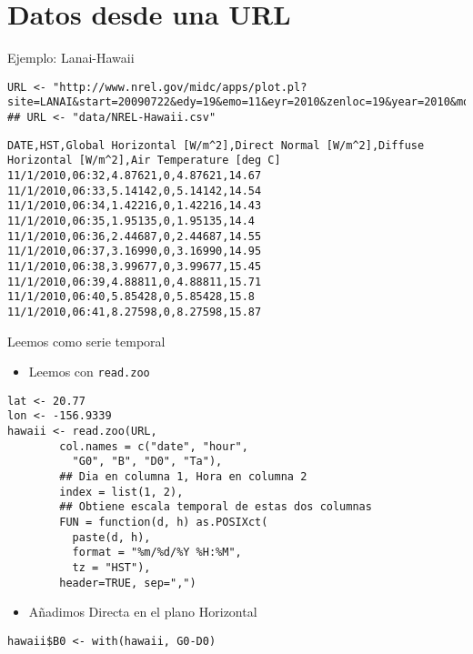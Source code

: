 \documentclass[xcolor={usenames,svgnames,dvipsnames}]{beamer}
\begin{document}
\section{Datos desde una URL}
\label{sec-4}
\begin{frame}[fragile,label=sec-4-1]{Ejemplo: Lanai-Hawaii}
 \lstset{language=R,numbers=none}
\begin{lstlisting}
URL <- "http://www.nrel.gov/midc/apps/plot.pl?site=LANAI&start=20090722&edy=19&emo=11&eyr=2010&zenloc=19&year=2010&month=11&day=1&endyear=2010&endmonth=11&endday=19&time=1&inst=3&inst=4&inst=5&inst=10&type=data&first=3&math=0&second=-1&value=0.0&global=-1&direct=-1&diffuse=-1&user=0&axis=1"
## URL <- "data/NREL-Hawaii.csv"
\end{lstlisting}

\begin{verbatim}
DATE,HST,Global Horizontal [W/m^2],Direct Normal [W/m^2],Diffuse Horizontal [W/m^2],Air Temperature [deg C]
11/1/2010,06:32,4.87621,0,4.87621,14.67
11/1/2010,06:33,5.14142,0,5.14142,14.54
11/1/2010,06:34,1.42216,0,1.42216,14.43
11/1/2010,06:35,1.95135,0,1.95135,14.4
11/1/2010,06:36,2.44687,0,2.44687,14.55
11/1/2010,06:37,3.16990,0,3.16990,14.95
11/1/2010,06:38,3.99677,0,3.99677,15.45
11/1/2010,06:39,4.88811,0,4.88811,15.71
11/1/2010,06:40,5.85428,0,5.85428,15.8
11/1/2010,06:41,8.27598,0,8.27598,15.87
\end{verbatim}
\end{frame}
\begin{frame}[fragile,label=sec-4-2]{Leemos como serie temporal}
 \begin{itemize}
\item Leemos con \texttt{read.zoo}
\end{itemize}
\lstset{language=R,numbers=none}
\begin{lstlisting}
lat <- 20.77
lon <- -156.9339
hawaii <- read.zoo(URL,
		col.names = c("date", "hour",
		  "G0", "B", "D0", "Ta"),
		## Dia en columna 1, Hora en columna 2
		index = list(1, 2),
		## Obtiene escala temporal de estas dos columnas
		FUN = function(d, h) as.POSIXct(
		  paste(d, h),
		  format = "%m/%d/%Y %H:%M",
		  tz = "HST"), 
		header=TRUE, sep=",")
\end{lstlisting}
\begin{itemize}
\item Añadimos Directa en el plano Horizontal
\end{itemize}
\lstset{language=R,numbers=none}
\begin{lstlisting}
hawaii$B0 <- with(hawaii, G0-D0)
\end{lstlisting}
\end{frame}
\end{document}
